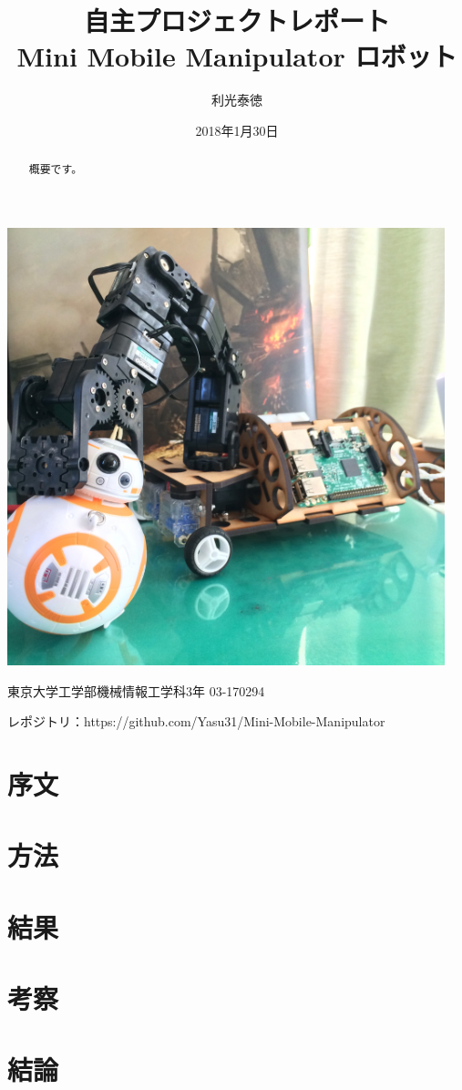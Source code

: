 \documentclass[dvipdfmx,uplatex]{jsarticle} %
\begin{document}
\title{自主プロジェクトレポート\\
Mini Mobile Manipulator ロボット}
\author{利光泰徳}
\date{2018年1月30日}
\maketitle
\begin{center}
\includegraphics[width=5in]{img/model.jpg}
\end{center}
\begin{flushright}
東京大学工学部機械情報工学科3年   03-170294

レポジトリ：https://github.com/Yasu31/Mini-Mobile-Manipulator
\end{flushright}

\pagebreak

\begin{abstract}
概要です。
\end{abstract}

\section{序文}
\cite{survey_of_robots}
\cite{youbot}
\cite{low_cost_7dof}
\section{方法}
\section{結果}
\section{考察}
\section{結論}



\end{document}
